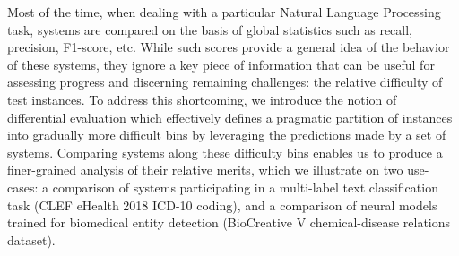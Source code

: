 Most of the time, when dealing with a particular Natural Language Processing task, systems are compared on the basis of global statistics such as recall, precision, F1-score, etc. While such scores provide a general idea of the behavior of these systems, they ignore a key piece of information that can be useful for assessing progress and discerning remaining challenges: the relative difficulty of test instances. To address this shortcoming, we introduce the notion of differential evaluation which effectively defines a pragmatic partition of instances into gradually more difficult bins by leveraging the predictions made by a set of systems. Comparing systems along these difficulty bins enables us to produce a finer-grained analysis of their relative merits, which we illustrate on two use-cases: a comparison of systems participating in a multi-label text classification task (CLEF eHealth 2018 ICD-10 coding), and a comparison of neural models trained for biomedical entity detection (BioCreative V chemical-disease relations dataset).
